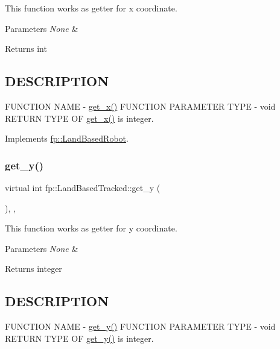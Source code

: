 This function works as getter for x coordinate. 


\begin{DoxyParams}{Parameters}
{\em None} & \\
\hline
\end{DoxyParams}
\begin{DoxyReturn}{Returns}
int 
\end{DoxyReturn}
\hypertarget{_m_a_z_e_8h_DESCRIPTION}{}\subsection{D\+E\+S\+C\+R\+I\+P\+T\+I\+ON}\label{_m_a_z_e_8h_DESCRIPTION}
F\+U\+N\+C\+T\+I\+ON N\+A\+ME -\/ \hyperlink{classfp_1_1_land_based_tracked_a3a4fc3c84dd3fcf1928a27af1658680f}{get\+\_\+x()} F\+U\+N\+C\+T\+I\+ON P\+A\+R\+A\+M\+E\+T\+ER T\+Y\+PE -\/ void R\+E\+T\+U\+RN T\+Y\+PE OF \hyperlink{classfp_1_1_land_based_tracked_a3a4fc3c84dd3fcf1928a27af1658680f}{get\+\_\+x()} is integer. 

Implements \hyperlink{classfp_1_1_land_based_robot_a3624c5d041de0987c0103c6b01fa9bc6}{fp\+::\+Land\+Based\+Robot}.

\mbox{\label{classfp_1_1_land_based_tracked_a09738928390e7e0d33444b6a7cfcc841}} 
\subsubsection{\texorpdfstring{get\+\_\+y()}{get\_y()}}
{\footnotesize\ttfamily virtual int fp\+::\+Land\+Based\+Tracked\+::get\+\_\+y (\begin{DoxyParamCaption}{ }\end{DoxyParamCaption})\hspace{0.3cm}{\ttfamily [inline]}, {\ttfamily [override]}, {\ttfamily [virtual]}}



This function works as getter for y coordinate. 


\begin{DoxyParams}{Parameters}
{\em None} & \\
\hline
\end{DoxyParams}
\begin{DoxyReturn}{Returns}
integer 
\end{DoxyReturn}
\hypertarget{_m_a_z_e_8h_DESCRIPTION}{}\subsection{D\+E\+S\+C\+R\+I\+P\+T\+I\+ON}\label{_m_a_z_e_8h_DESCRIPTION}
F\+U\+N\+C\+T\+I\+ON N\+A\+ME -\/ \hyperlink{classfp_1_1_land_based_tracked_a09738928390e7e0d33444b6a7cfcc841}{get\+\_\+y()} F\+U\+N\+C\+T\+I\+ON P\+A\+R\+A\+M\+E\+T\+ER T\+Y\+PE -\/ void R\+E\+T\+U\+RN T\+Y\+PE OF \hyperlink{classfp_1_1_land_based_tracked_a09738928390e7e0d33444b6a7cfcc841}{get\+\_\+y()} is integer. 

